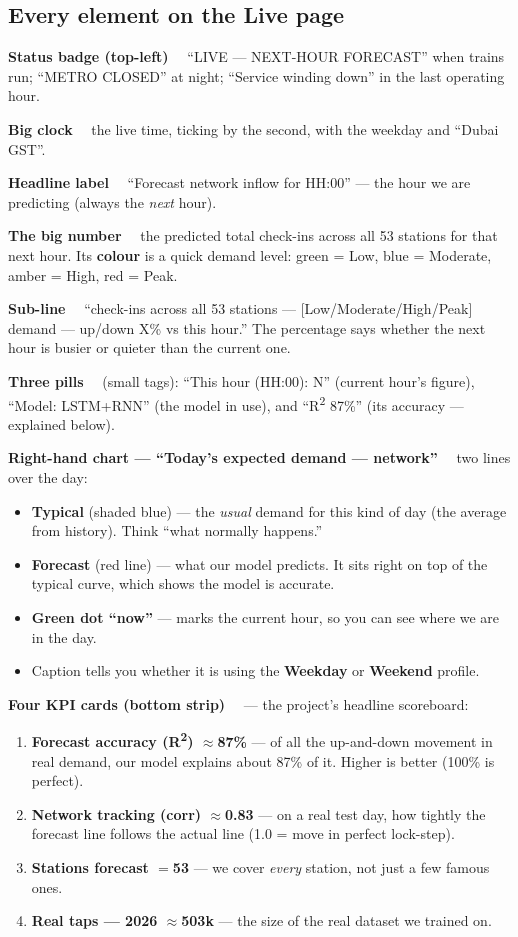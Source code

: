 \documentclass[11pt]{article}
\newcommand{\elem}[1]{\smallskip\noindent\textbf{\color{metroRed}#1}\ \ }
\begin{document}
\subsection{Every element on the Live page}
\elem{Status badge (top-left)} ``LIVE --- NEXT-HOUR FORECAST'' when trains run; ``METRO CLOSED'' at
night; ``Service winding down'' in the last operating hour.

\elem{Big clock} the live time, ticking by the second, with the weekday and ``Dubai GST''.

\elem{Headline label} ``Forecast network inflow for HH:00'' --- the hour we are predicting (always the
\emph{next} hour).

\elem{The big number} the predicted total check-ins across all 53 stations for that next hour. Its
\textbf{colour} is a quick demand level: green = Low, blue = Moderate, amber = High, red = Peak.

\elem{Sub-line} ``check-ins across all 53 stations --- [Low/Moderate/High/Peak] demand --- up/down X\%
vs this hour.'' The percentage says whether the next hour is busier or quieter than the current one.

\elem{Three pills} (small tags): ``This hour (HH:00): N'' (current hour's figure), ``Model:
LSTM+RNN'' (the model in use), and ``R\textsuperscript{2} 87\%'' (its accuracy --- explained below).

\elem{Right-hand chart --- ``Today's expected demand --- network''} two lines over the day:
\begin{itemize}
  \item \textbf{Typical} (shaded blue) --- the \emph{usual} demand for this kind of day (the average
        from history). Think ``what normally happens.''
  \item \textbf{Forecast} (red line) --- what our model predicts. It sits right on top of the typical
        curve, which shows the model is accurate.
  \item \textbf{Green dot ``now''} --- marks the current hour, so you can see where we are in the day.
  \item Caption tells you whether it is using the \textbf{Weekday} or \textbf{Weekend} profile.
\end{itemize}

\elem{Four KPI cards (bottom strip)} --- the project's headline scoreboard:
\begin{enumerate}
  \item \textbf{Forecast accuracy (R\textsuperscript{2}) $\approx$87\%} --- of all the up-and-down
        movement in real demand, our model explains about 87\% of it. Higher is better (100\% is perfect).
  \item \textbf{Network tracking (corr) $\approx$0.83} --- on a real test day, how tightly the forecast
        line follows the actual line (1.0 = move in perfect lock-step).
  \item \textbf{Stations forecast $=$53} --- we cover \emph{every} station, not just a few famous ones.
  \item \textbf{Real taps --- 2026 $\approx$503k} --- the size of the real dataset we trained on.
\end{enumerate}
\end{document}
